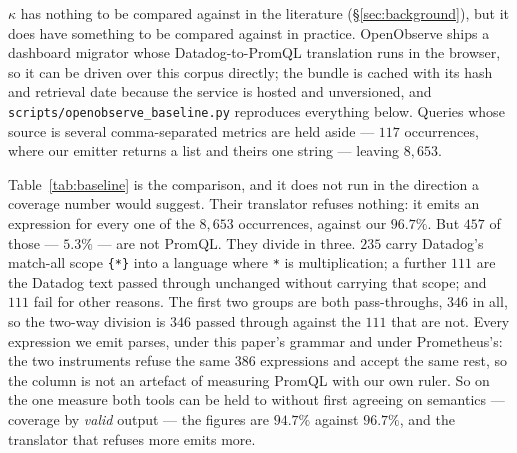 $\kappa$ has nothing to be compared against in the literature (\S\ref{sec:background}),
but it does have something to be compared against in practice. OpenObserve ships a
dashboard migrator whose Datadog-to-PromQL translation runs in the browser, so it can be
driven over this corpus directly; the bundle is cached with its hash and retrieval date
because the service is hosted and unversioned, and
\texttt{scripts/openobserve\_baseline.py} reproduces everything below. Queries whose
source is several comma-separated metrics are held aside --- $117$ occurrences, where our
emitter returns a list and theirs one string --- leaving $8{,}653$.

\begin{table}[htbp]\centering\footnotesize

\caption{The same corpus through both translators, by occurrence. ``Parses'' is judged by
this paper's PromQL grammar (\S\ref{sec:grammars}), which predates both translators'
output and is tuned to neither --- and which Prometheus~3.15.0's own parser now agrees
with on every one of the $14{,}555$ distinct expressions the two translators emit between
them, in both directions (Remark~\ref{rem:baseline}). Our two rows sum to $99.9\%$ rather
than $100\%$: both columns are over the full $8{,}653$, and the $8$ occurrences
\S\ref{sec:grammars}'s Datadog grammar does not parse never reach \emph{our}
translator's input, so our two outcomes account for $8{,}645$ of them. Their emitter
sees all $8{,}653$.}
\label{tab:baseline}
\end{table}

Table~\ref{tab:baseline} is the comparison, and it does not run in the direction a
coverage number would suggest.
Their translator refuses nothing: it emits an expression for every one of the $8{,}653$
occurrences, against our $96.7\%$. But $457$ of those --- $5.3\%$ --- are not PromQL.
They divide in three. $235$ carry Datadog's match-all scope \texttt{\{*\}} into a
language where \texttt{*} is multiplication; a further $111$ are the Datadog text
passed through unchanged without carrying that scope; and $111$ fail for other
reasons. The first two groups are both pass-throughs, $346$ in all, so the two-way
division is $346$ passed through against the $111$ that are not. Every expression we emit parses, under this paper's grammar and under
Prometheus's: the two instruments refuse the same $386$ expressions and accept the same
rest, so the column is not an artefact of measuring PromQL with our own ruler. So on the
one measure both tools can be
held to without first agreeing on semantics --- coverage by \emph{valid} output --- the
figures are $94.7\%$ against $96.7\%$, and the translator that refuses more emits more.

